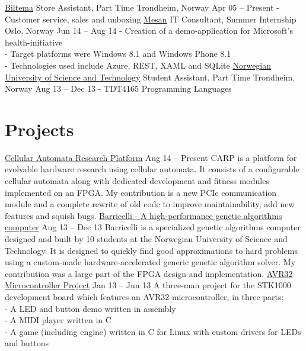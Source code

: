 \documentclass[print]{friggeri-cv}
\begin{document}
\begin{entrylist}
    \entryx
        {\href{http://biltema.no/}{Biltema}}
        {Store Assistant, Part Time}
        {Trondheim, Norway}
        {Apr 05 – Present}
        {- Customer service, sales and unboxing}
    \entryspace
    \entryx
        {\href{http://mesan.no/}{Mesan}}
        {IT Consultant, Summer Internship}
        {Oslo, Norway}
        {Jun 14 – Aug 14}
        {- Creation of a demo-application for Microsoft's health-initiative\\
         - Target platforms were Windows 8.1 and Windows Phone 8.1\\
         - Technologies used include Azure, REST, XAML and SQLite}
    \entryspace
    \entryx
        {\href{http://ntnu.no/}{Norwegian University of Science and Technology}}
        {Student Assistant, Part Time}
        {Trondheim, Norway}
        {Aug 13 – Dec 13}
        {- TDT4165 Programming Languages}
\end{entrylist}

\section{Projects}

\begin{entrylist}
    \entryy
        {\href{https://github.com/lundal/carp-report}{Cellular Automata Research Platform}}
        {Aug 14 – Present}
        {CARP is a platform for evolvable hardware research using cellular automata.
         It consists of a configurable cellular automata along with dedicated development and fitness modules implemented on an FPGA.
         My contribution is a new PCIe communication module and a complete rewrite of old code to improve maintainability, add new features and squish bugs.}
    \entryspace
    \entryy
        {\href{http://lund.al/barricel.li/}{Barricelli - A high-performance genetic algorithms computer}}
        {Aug 13 – Dec 13}
        {Barricelli is a specialized genetic algorithms computer designed and built by 10 students at the Norwegian University of Science and Technology.
         It is designed to quickly find good approximations to hard problems using a custom-made hardware-accelerated generic genetic algorithm solver.
         My contribution was a large part of the FPGA design and implementation.}
    \entryspace
    \entryy
        {\href{https://github.com/lundal/avr32-project-2013}{AVR32 Microcontroller Project}}
        {Jan 13 – Jun 13}
        {A three-man project for the STK1000 development board which features an AVR32 microcontroller, in three parts:\\
        - A LED and button demo written in assembly\\
        - A MIDI player written in C\\
        - A game (including engine) written in C for Linux with custom drivers for LEDs and buttons}
\end{entrylist}
\end{document}
